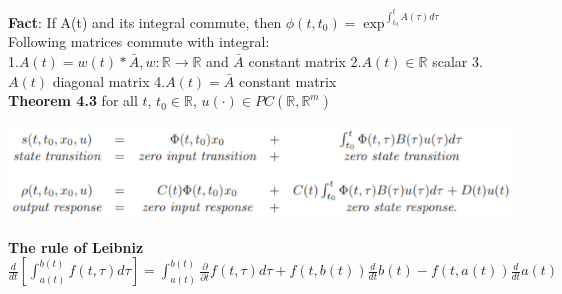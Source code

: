 \documentclass[10pt,landscape]{article}
\newenvironment{Figure}
{\par\medskip\noindent\minipage{\linewidth}}
{\endminipage\par\medskip}
\begin{document}
\begin{multicols*}{4}
\textbf{Fact}: If A(t) and its integral commute, then $\phi(t, t_0) = \exp^{\int_{t_0}^{t}A(\tau)d\tau}$\\
Following matrices commute with integral:\\
1.$A(t)=w(t)*\bar{A}, w: \mathbb{R} \rightarrow \mathbb{R}$ and $\bar{A}$ constant matrix
2.$A(t) \in \mathbb{R}$ scalar
3.$A(t)$ diagonal matrix
4.$A(t) = \bar{A}$ constant matrix\\

\textbf{Theorem 4.3} for all $t$, $t_0 \in \mathbb{R}$, $u(\cdot) \in PC(\mathbb{R}, \mathbb{R}^m)$
\begin{Figure}
	\centering
	\includegraphics[width=\linewidth]{pictures/Th4_3.png}
\end{Figure}

\textbf{The rule of Leibniz}
$\frac{d}{dt}[ \int_{a(t)}^{b(t)} f(t, \tau) d\tau ] = \int_{a(t)}^{b(t)} \frac{\partial}{\partial t}f(t, \tau) d\tau + f(t, b(t))\frac{d}{dt}b(t) - f(t, a(t))\frac{d}{dt}a(t)$ \\


\end{multicols*}
\end{document}
